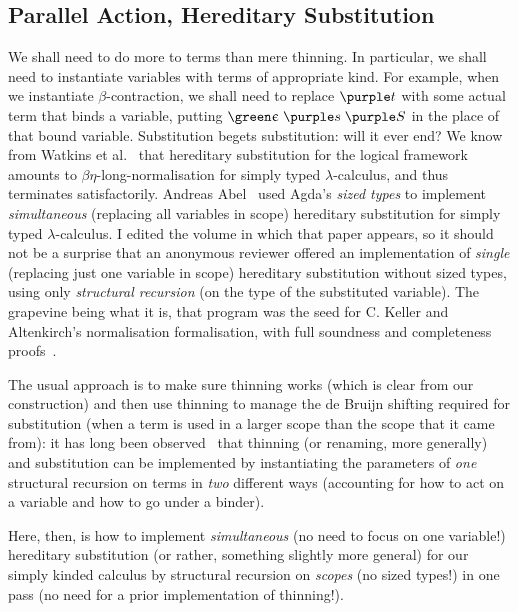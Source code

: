 \documentclass[natbib]{article}
\begin{document}
\subsection{Parallel Action, Hereditary Substitution}

We shall need to do more to terms than mere thinning. In particular, we shall need to instantiate variables with terms of appropriate kind. For example, when we instantiate $\beta$-contraction, we shall need to replace $\V t$ with some actual term that binds a variable, putting
$\tyc\;\V s\;\V S$ in the place of that bound variable. Substitution begets substitution: will it ever end? We know from Watkins et al.~\cite{DBLP:conf/types/WatkinsCPW03} that hereditary substitution for the logical framework amounts to $\beta\eta$-long-normalisation for simply typed $\lambda$-calculus, and thus terminates satisfactorily. Andreas Abel~\cite{DBLP:conf/mpc/000106} used Agda's \emph{sized types}
to implement \emph{simultaneous} (replacing all variables in scope) hereditary substitution for simply typed $\lambda$-calculus. I edited the volume in which that paper appears, so it should not be a surprise that an anonymous reviewer offered an implementation of \emph{single} (replacing just one variable in scope) hereditary substitution without sized types, using only \emph{structural recursion} (on the type of the substituted variable). The grapevine being what it is, that program was the seed for C. Keller and Altenkirch's normalisation formalisation, with full soundness and completeness proofs~\cite{DBLP:conf/icfp/KellerA10}.

The usual approach is to make sure thinning works (which is clear from our construction) and then use thinning to manage the de Bruijn shifting required for substitution (when a term is used in a larger scope than the scope that it came from): it has long been observed~\cite{Goguen97candidatesfor,DBLP:phd/ethos/McBride00} that thinning (or renaming, more generally) and substitution can be implemented by instantiating the parameters of \emph{one} structural recursion on terms in \emph{two} different ways (accounting for how to act on a variable and how to go under a binder).

Here, then, is how to implement \emph{simultaneous} (no need to focus on one variable!) hereditary substitution (or rather, something slightly more general) for our simply kinded calculus by structural recursion on \emph{scopes} (no sized types!) in one pass (no need for a prior implementation of thinning!).
\newcommand{\act}[3]{#1 \left[#2\right> #3}
\end{document}

